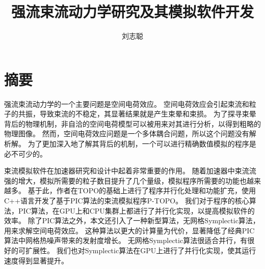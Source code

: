   \confidential{}%
  \title[强流束流动力学研究及其模拟软件开发]{强流束流动力学研究及其模拟软件开发}%
  \author{刘志聪}%

\maketitle
\makeenglishtitle
\makedeclaration
\chapter{摘\quad 要}%

强流束流动力学的一个主要问题是空间电荷效应。
空间电荷效应会引起束流和粒子的共振，导致束流的不稳定，其显著结果就是产生束晕和束损。
为了探寻束晕背后的物理机制，非自洽的空间电荷模型可以被用来对其进行分析，以得到粗略的物理图像。
然而，空间电荷效应问题是一个多体耦合问题，所以这个问题没有解析解。
为了更加深入地了解其背后的机制，一个可以进行精确数值模拟的程序是必不可少的。

束流模拟软件在加速器研究和设计中起着非常重要的作用。
随着加速器中束流流强的增大，模拟所需要的粒子数目提升了几个量级，模拟程序所需要的功能也越来越多。
基于此，作者在TOPO的基础上进行了程序并行化处理和功能扩充，使用C++语言开发了基于PIC算法的束流模拟程序P-TOPO。
我们对于程序的核心算法，PIC算法，在GPU上和CPU集群上都进行了并行化实现，以提高模拟软件的效率。
除了PIC算法之外，本文还引入了一种新型算法，无网格Symplectic算法，用来求解空间电荷效应。
这种算法以更大的计算量为代价，显著降低了经典PIC算法中网格热噪声带来的发射度增长。
无网格Symplectic算法很适合并行，有很好的可扩展性。
我们也对Symplectic算法在GPU上进行了并行化实现，使其运行速度得到显著提升。

